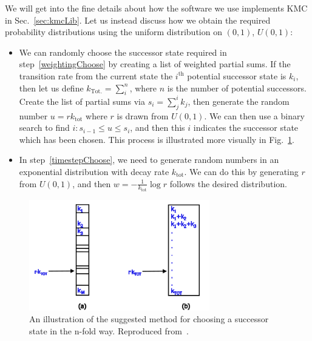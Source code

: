 We will get into the fine details about how the software we use implements KMC in Sec.~\ref{sec:kmcLib}.
Let us instead discuss how we obtain the required probability distributions using the uniform distribution
on $(0, 1)$, $U(0, 1)$:
\begin{itemize}
 \item We can randomly choose the successor state required in step~\ref{weightingChoose} by
 creating a list of weighted partial sums. If the transition rate from the current state the $i^\mathrm{th}$
 potential successor state is $k_i$, then let us define $k_\mathrm{Tot.} = \sum_{i}^n$, where $n$ is the
 number of potential successors. Create the list of partial sums via $s_i = \sum_j^i k_j$, then generate
 the random number $u = r k_\mathrm{tot}$ where $r$ is drawn from $U(0, 1)$. We can then use a binary
 search to find $i: s_{i-1} \le u \le s_i$, and then this $i$ indicates the successor state which has been
 chosen. This process is illustrated more visually in Fig.~\ref{fig:weightChoice}.
 \item In step~\ref{timestepChoose}, we need to generate random numbers in an exponential distribution
 with decay rate $k_\mathrm{tot}$. We can do this by generating $r$ from $U(0, 1)$, and then $w = -\frac{1}{k_\mathrm{tot}} \log{r}$
 follows the desired distribution.
\end{itemize}
\begin{figure}[h!]
 \caption[Illustration of the method for choosing successor states in the n-fold way.]{\label{fig:weightChoice} 
 An illustration of the suggested method for choosing a successor state in the n-fold way. Reproduced
 from~\cite{voterKMC}.
 }
  \begin{center}
 \includegraphics[width=0.7\textwidth]{numerics/images/nFoldWayRates}
  \end{center}
\end{figure}

